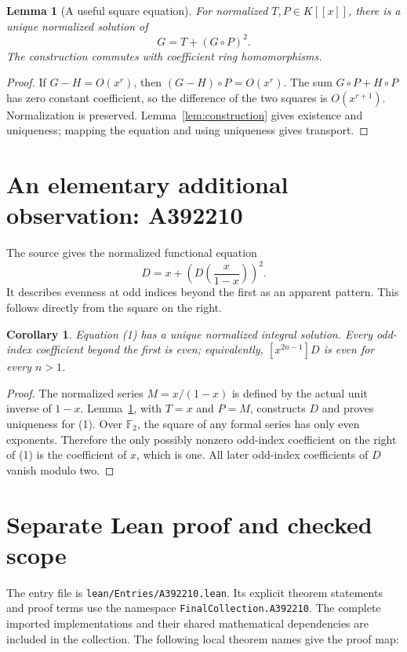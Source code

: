 \documentclass[11pt,a4paper]{article}
\newtheorem{lemma}[theorem]{Lemma}
\newtheorem{corollary}[theorem]{Corollary}
\theoremstyle{remark}
\newcommand{\F}{\mathbb F}
\begin{document}
\begin{lemma}[A useful square equation]\label{lem:square}
For normalized $T,P\in K[[x]]$, there is a unique normalized solution of
\[
 G=T+(G\circ P)^2.
\]
The construction commutes with coefficient ring homomorphisms.
\end{lemma}

\begin{proof}
If $G-H=O(x^r)$, then $(G-H)\circ P=O(x^r)$. The sum
$G\circ P+H\circ P$ has zero constant coefficient, so the difference
of the two squares is $O(x^{r+1})$. Normalization is preserved.
Lemma~\ref{lem:construction} gives existence and uniqueness; mapping the
equation and using uniqueness gives transport.
\end{proof}

\section{An elementary additional observation: A392210}\label{sec:odd}

The source gives the normalized functional equation \cite{oeis210}
\[
 D=x+\left(D\!\left(\frac{x}{1-x}\right)\right)^2. \tag{1}
\]
It describes evenness at odd indices beyond the first as an apparent
pattern. This follows directly from the square on the right.

\begin{corollary}
Equation (1) has a unique normalized integral solution. Every
odd-index coefficient beyond the first is even; equivalently,
$[x^{2n-1}]D$ is even for every $n>1$.
\end{corollary}

\begin{proof}
The normalized series $M=x/(1-x)$ is defined by the actual unit inverse
of $1-x$. Lemma~\ref{lem:square}, with $T=x$ and $P=M$, constructs $D$
and proves uniqueness for (1). Over $\F_2$, the square of any formal
series has only even exponents. Therefore the only possibly nonzero
odd-index coefficient on the right of (1) is the coefficient of $x$,
which is one. All later odd-index coefficients of $D$ vanish modulo two.
\end{proof}


\section{Separate Lean proof and checked scope}

The entry file is \nolinkurl{lean/Entries/A392210.lean}. Its explicit
theorem statements and proof terms use the namespace
\nolinkurl{FinalCollection.A392210}. The complete imported implementations
and their shared mathematical dependencies are included in the collection.
The following local theorem names give the proof map:
\end{document}
